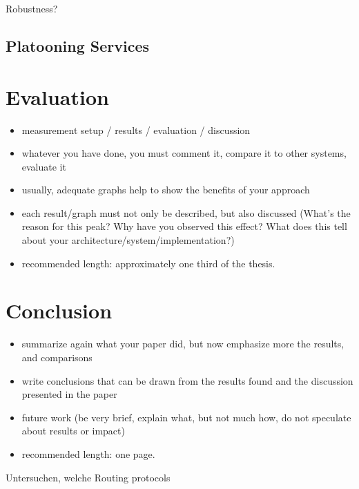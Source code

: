 \documentclass[]{nsm-thesis}
\begin{document}

Robustness?




\begin{comment}
	Fixed Wifi 6 devices: 4 Streams, 2.4, 5.0 Ghz
Fixed Wifi bd devices: 1 Stream, 5.9 Ghz,

Leave it open for future work?
look for different chips?

Auf different paper stützen?


\end{comment}

\section{Platooning Services}


\chapter{Evaluation}


\begin{itemize}
\item measurement setup / results / evaluation / discussion
\item whatever you have done, you must comment it, compare it to other systems, evaluate it
\item usually, adequate graphs help to show the benefits of your approach
\item each result/graph must not only be described, but also discussed (What's the reason for this peak? Why have you observed this effect? What does this tell about your architecture/system/implementation?)
\item recommended length: approximately one third of the thesis.
\end{itemize}



\chapter{Conclusion}


\begin{itemize}
\item summarize again what your paper did, but now emphasize more the results, and comparisons
\item write conclusions that can be drawn from the results found and the discussion presented in the paper
\item future work (be very brief, explain what, but not much how, do not speculate about results or impact)
\item recommended length: one page.
\end{itemize}

Untersuchen, welche Routing protocols

\cleardoublepage

\listofabbreviations
\clearpage

\listoffigures
\clearpage

\listoftables
\clearpage

\printbibliography
\end{document}
